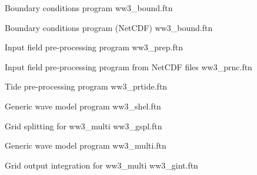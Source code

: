 \noindent
Boundary conditions program \hfill {\file ww3\_bound.ftn}

\noindent
Boundary conditions program (NetCDF) \hfill {\file ww3\_bound.ftn}

\begin{flisti}
\end{flisti}

\noindent
Input field pre-processing program \hfill {\file ww3\_prep.ftn}

\noindent
Input field pre-processing program from NetCDF files \hfill {\file ww3\_prnc.ftn}

\begin{flisti}
\end{flisti}

\noindent
Tide pre-processing program \hfill {\file ww3\_prtide.ftn}

\begin{flisti}
\end{flisti}


\noindent
Generic wave model program \hfill {\file ww3\_shel.ftn}

\begin{flisti}
\end{flisti}




\noindent
Grid splitting for {\file ww3\_multi} \hfill {\file ww3\_gspl.ftn}

\begin{flisti}
\end{flisti}

\noindent
Generic wave model program \hfill {\file ww3\_multi.ftn}

\begin{flisti}
\end{flisti}

\noindent
Grid output integration for {\file ww3\_multi} \hfill {\file ww3\_gint.ftn}

\begin{flisti}
\end{flisti}

